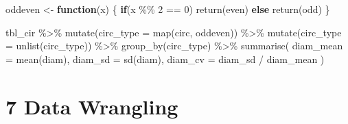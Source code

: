\documentclass[
]{book}
\newenvironment{Shaded}{\begin{snugshade}}{\end{snugshade}}
\newcommand{\AttributeTok}[1]{\textcolor[rgb]{0.77,0.63,0.00}{#1}}
\newcommand{\ControlFlowTok}[1]{\textcolor[rgb]{0.13,0.29,0.53}{\textbf{#1}}}
\newcommand{\DecValTok}[1]{\textcolor[rgb]{0.00,0.00,0.81}{#1}}
\newcommand{\FunctionTok}[1]{\textcolor[rgb]{0.00,0.00,0.00}{#1}}
\newcommand{\NormalTok}[1]{#1}
\newcommand{\OtherTok}[1]{\textcolor[rgb]{0.56,0.35,0.01}{#1}}
\newcommand{\SpecialCharTok}[1]{\textcolor[rgb]{0.00,0.00,0.00}{#1}}
\newcommand{\StringTok}[1]{\textcolor[rgb]{0.31,0.60,0.02}{#1}}
\begin{document}
\begin{Shaded}
\begin{Highlighting}[]
\NormalTok{oddeven }\OtherTok{\textless{}{-}} \ControlFlowTok{function}\NormalTok{(x) \{ }
  \ControlFlowTok{if}\NormalTok{(x }\SpecialCharTok{\%\%} \DecValTok{2} \SpecialCharTok{==} \DecValTok{0}\NormalTok{) }\FunctionTok{return}\NormalTok{(}\StringTok{\textquotesingle{}even\textquotesingle{}}\NormalTok{)}
  \ControlFlowTok{else} \FunctionTok{return}\NormalTok{(}\StringTok{\textquotesingle{}odd\textquotesingle{}}\NormalTok{)}
\NormalTok{\}}

\NormalTok{tbl\_cir }\SpecialCharTok{\%\textgreater{}\%} 
  \FunctionTok{mutate}\NormalTok{(}\AttributeTok{circ\_type =} \FunctionTok{map}\NormalTok{(circ, oddeven)) }\SpecialCharTok{\%\textgreater{}\%}
  \FunctionTok{mutate}\NormalTok{(}\AttributeTok{circ\_type =} \FunctionTok{unlist}\NormalTok{(circ\_type)) }\SpecialCharTok{\%\textgreater{}\%}
  \FunctionTok{group\_by}\NormalTok{(circ\_type) }\SpecialCharTok{\%\textgreater{}\%}
  \FunctionTok{summarise}\NormalTok{(}
    \AttributeTok{diam\_mean =} \FunctionTok{mean}\NormalTok{(diam),}
    \AttributeTok{diam\_sd =} \FunctionTok{sd}\NormalTok{(diam),}
    \AttributeTok{diam\_cv =}\NormalTok{ diam\_sd }\SpecialCharTok{/}\NormalTok{ diam\_mean}
\NormalTok{  )}
\end{Highlighting}
\end{Shaded}

\hypertarget{data-wrangling-1}{%
\section*{\texorpdfstring{\textbf{7} Data Wrangling}{7 Data Wrangling}}\label{data-wrangling-1}}
\end{document}
